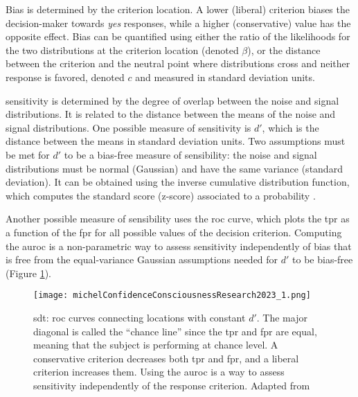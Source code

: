 Bias is determined by the criterion location. A lower (liberal) criterion biases the decision-maker towards \textit{yes} responses, while a higher (conservative) value has the opposite effect. Bias can be quantified using either the ratio of the likelihoods for the two distributions at the criterion location (denoted $\beta$), or the distance between the criterion and the neutral point where distributions cross and neither response is favored, denoted $c$ and measured in standard deviation units.

\Gls{sensitivity} is determined by the degree of overlap between the noise and signal distributions. It is related to the distance between the means of the noise and signal distributions. One possible measure of \gls{sensitivity} is $d'$, which is the distance between the means in standard deviation units. Two assumptions must be met for $d'$ to be a bias-free measure of sensibility: the noise and signal distributions must be normal (Gaussian) and have the same variance (standard deviation). It can be obtained using the inverse cumulative distribution function, which computes the standard score (z-score) associated to a probability \cite{stanislawCalculationSignalDetection1999}.

Another possible measure of sensibility uses the \acrfull{roc} curve, which plots the \acrlong{tpr} as a function of the \acrlong{fpr} for all possible values of the decision criterion. Computing the \acrfull{auroc} is a non-parametric way to assess \gls{sensitivity} independently of bias that is free from the equal-variance Gaussian assumptions needed for $d'$ to be bias-free \cite{flemingHowMeasureMetacognition2014} (Figure \ref{figure:roc_curves}).

\begin{figure}[ht]
    \centering
    \texttt{[image: michelConfidenceConsciousnessResearch2023\_1.png]}
    \caption[\acrlong{sdt}: \acrshort{roc} curves]{\acrlong{sdt}: \acrshort{roc} curves connecting locations with constant $d'$. The major diagonal is called the “chance line” since the \acrlong{tpr} and \acrlong{fpr} are equal, meaning that the subject is performing at chance level. A conservative criterion decreases both \acrshort{tpr} and \acrshort{fpr}, and a liberal criterion increases them. Using the \acrfull{auroc} is a way to assess \gls{sensitivity} independently of the response criterion. Adapted from \cite{michelConfidenceConsciousnessResearch2023}}
    \label{figure:roc_curves}
\end{figure}

